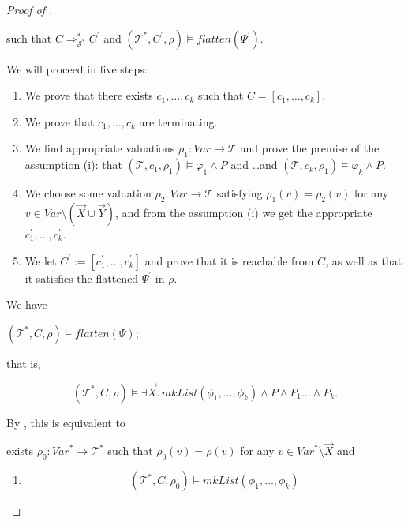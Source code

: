 \begin{proof}[Proof of ]
\begin{enumerate}
\begin{proofenv}
    such that
    $C \Rightarrow^{*}_{\mathcal{S}^*} C^\prime$
    and $(\mathcal{T}^*, C^\prime, \rho) \vDash \mathit{flatten}(\Psi^\prime)$.
    \end{proofenv}
    We will proceed in five steps:
    \begin{enumerate}
        \item \label{item:corr:step1} We prove that there exists $c_1,\ldots,c_k$ such that $C = [c_1,\ldots, c_k]$.
        \item \label{item:corr:step2} We prove that $c_1,\ldots,c_k$ are terminating.
        \item \label{item:corr:step3} We find appropriate valuations $\rho_1 : \mathit{Var} \to \mathcal{T}$
              and prove the premise of the assumption (i): that $(\mathcal{T}, c_1, \rho_1) \vDash \varphi_1 \land P$
        and \ldots and $(\mathcal{T}, c_k, \rho_1) \vDash \varphi_k \land P$.
        \item \label{item:corr:step4} We choose some valuation $\rho_2 : \mathit{Var} \to \mathcal{T}$ satisfying $\rho_1(v) = \rho_2(v)$ for any $v \in \mathit{Var} \setminus (\vec{X} \cup \vec{Y})$, and from the assumption (i) we get the appropriate $c_1^\prime,\ldots,c_k^\prime$.
        \item \label{item:corr:step5} We let $C^\prime := [c_1^\prime,\ldots,c_k^\prime]$ and prove that it is reachable from $C$,
        as well as that it satisfies the flattened $\Psi^\prime$ in $\rho$.
    \end{enumerate}
    We have
    \begin{proofenv}
    $(\mathcal{T}^*, C, \rho) \vDash \mathit{flatten}(\Psi)$;
    \end{proofenv}
    that is,
    \begin{proofenv}
    \begin{equation*}
     (\mathcal{T}^*, C, \rho) \vDash \exists \vec{X}.\, \mathit{mkList}(\phi_1,\ldots,\phi_k) \land P \land P_1 \ldots \land P_k.
    \end{equation*}
    \end{proofenv}
    By , this is equivalent to
    \begin{proofenv}
    exists $\rho_0 : \mathit{Var}^* \to \mathcal{T}^*$ such that $\rho_0(v) = \rho(v)$ for any $v \in \mathit{Var}^* \setminus \vec{X}$ and
    \begin{enumerate}
        \item 
        \begin{equation*}
            (\mathcal{T}^*, C, \rho_0) \vDash \mathit{mkList}(\phi_1, \ldots, \phi_k)

\end{equation*}
\end{enumerate}
\end{proofenv}
\end{enumerate}
\end{proof}
